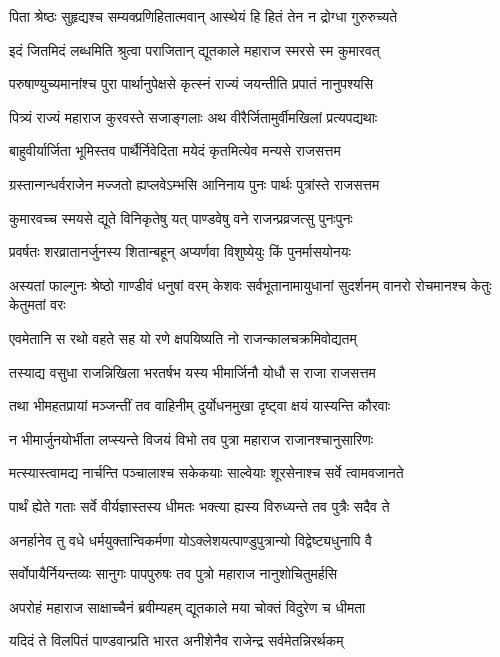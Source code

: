 \twolineshloka
{पिता श्रेष्ठः सुहृद्यश्च सम्यक्प्रणिहितात्मवान्}
{आस्थेयं हि हितं तेन न द्रोग्धा गुरुरुच्यते}


\twolineshloka
{इदं जितमिदं लब्धमिति श्रुत्वा पराजितान्}
{द्यूतकाले महाराज स्मरसे स्म कुमारवत्}


\twolineshloka
{परुषाण्युच्यमानांश्च पुरा पार्थानुपेक्षसे}
{कृत्स्नं राज्यं जयन्तीति प्रपातं नानुपश्यसि}


\twolineshloka
{पित्र्यं राज्यं महाराज कुरवस्ते सजाङ्गलाः}
{अथ वीरैर्जितामुर्वीमखिलां प्रत्यपद्यथाः}


\twolineshloka
{बाहुवीर्यार्जिता भूमिस्तव पार्थैर्निवेदिता}
{मयेदं कृतमित्येव मन्यसे राजसत्तम}


\twolineshloka
{ग्रस्तान्गन्धर्वराजेन मज्जतो ह्यप्लवेऽम्भसि}
{आनिनाय पुनः पार्थः पुत्रांस्ते राजसत्तम}


\twolineshloka
{कुमारवच्च स्मयसे द्यूते विनिकृतेषु यत्}
{पाण्डवेषु वने राजन्प्रव्रजत्सु पुनःपुनः}


\twolineshloka
{प्रवर्षतः शरव्रातानर्जुनस्य शितान्बहून्}
{अप्यर्णवा विशुष्येयुः किं पुनर्मासयोनयः}


\threelineshloka
{अस्यतां फाल्गुनः श्रेष्ठो गाण्डीवं धनुषां वरम्}
{केशवः सर्वभूतानामायुधानां सुदर्शनम्}
{वानरो रोचमानश्च केतुः केतुमतां वरः}


\twolineshloka
{एवमेतानि स रथो वहते सह यो रणे}
{क्षपयिष्यति नो राजन्कालचक्रमिवोद्यतम्}


\twolineshloka
{तस्याद्य वसुधा राजन्निखिला भरतर्षभ}
{यस्य भीमार्जिनौ योधौ स राजा राजसत्तम}


\twolineshloka
{तथा भीमहतप्रायां मञ्जन्तीं तव वाहिनीम्}
{दुर्योधनमुखा दृष्ट्वा क्षयं यास्यन्ति कौरवाः}


\twolineshloka
{न भीमार्जुनयोर्भीता लप्स्यन्ते विजयं विभो}
{तव पुत्रा महाराज राजानश्चानुसारिणः}


\twolineshloka
{मत्स्यास्त्वामद्य नार्चन्ति पञ्चालाश्च सकेकयाः}
{साल्वेयाः शूरसेनाश्च सर्वे त्वामवजानते}


\twolineshloka
{पार्थं ह्येते गताः सर्वे वीर्यज्ञास्तस्य धीमतः}
{भक्त्या ह्यस्य विरुध्यन्ते तव पुत्रैः सदैव ते}


\twolineshloka
{अनर्हानेव तु वधे धर्मयुक्तान्विकर्मणा}
{योऽक्लेशयत्पाण्डुपुत्रान्यो विद्वेष्ट्यधुनापि वै}


\twolineshloka
{सर्वोपायैर्नियन्तव्यः सानुगः पापपुरुषः}
{तव पुत्रो महाराज नानुशोचितुमर्हसि}


\twolineshloka
{अपरोहं महाराज साक्षाच्चैनं ब्रवीम्यहम्}
{द्यूतकाले मया चोक्तं विदुरेण च धीमता}


\twolineshloka
{यदिदं ते विलपितं पाण्डवान्प्रति भारत}
{अनीशेनैव राजेन्द्र सर्वमेतन्निरर्थकम्}


